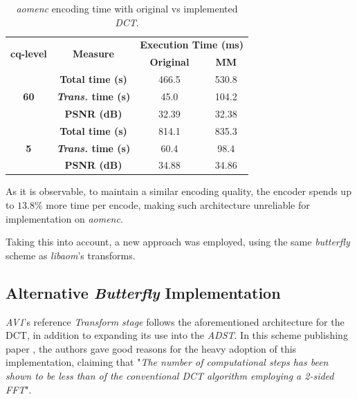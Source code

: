 \begin{table}[!htpb]
    \centering
    \caption{\emph{aomenc} encoding time with original vs implemented \emph{DCT}.}
    \begin{tabular}{cccc} \toprule
        \multirow{2}{*}{\textbf{cq-level}} & \multirow{2}{*}{\textbf{Measure}} &    \multicolumn{2}{c}{\textbf{Execution Time (ms)}} \\
        &   &   \textbf{Original} &      \textbf{MM} \\ \toprule
         \multirow{3}{*}{\textbf{60}}   & \textbf{Total time (s)}       & 466.5     & 530.8 \\
                                        & \textbf{\emph{Trans.} time (s)}    & 45.0      & 104.2 \\
                                        & \textbf{PSNR (dB)}            & 32.39     & 32.38 \\ \hline
         \multirow{3}{*}{\textbf{5}}    & \textbf{Total time (s)}       & 814.1     & 835.3 \\
                                        & \textbf{\emph{Trans.} time (s)}    & 60.4      & 98.4 \\
                                        & \textbf{PSNR (dB)}            & 34.88     & 34.86 \\                                        
         \bottomrule
    \end{tabular}    
    \label{tab:multresults}
\end{table}

As it is observable, to maintain a similar encoding quality, the encoder spends up to $13.8\%$ more time per encode, making such architecture unreliable for implementation on \emph{aomenc}.

Taking this into account, a new approach was employed, using the same \emph{butterfly} scheme as \emph{libaom}'s transforms.

\subsection{Alternative \emph{Butterfly} Implementation}

\emph{AV1}'s reference \emph{Transform stage} follows the aforementioned architecture for the DCT, in addition to expanding its use into the \emph{ADST}. In this scheme publishing paper \cite{wen-hsiungchenFastComputationalAlgorithm1977}, the authors gave good reasons for the heavy adoption of this implementation, claiming that "\emph{The number of computational steps has been shown to be less than  of the conventional DCT algorithm employing a 2-sided FFT}". 

